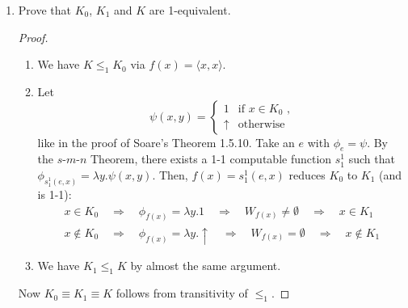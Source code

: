 \documentclass[a4paper,11pt]{article}
\begin{document}
\begin{enumerate}
\item %
Prove that $K_0$, $K_1$ and $K$ are 1-equivalent.

\begin{proof}
\begin{enumerate}
\item We have $K \leq_1 K_0$ via $f(x) = \langle x,x \rangle$.
\item Let
  \begin{equation*}
    \psi(x, y) = \begin{cases}
      1        & \text{if $x \in K_0$ ,}\\
      \uparrow & \text{otherwise}
    \end{cases}
  \end{equation*}
  like in the proof of Soare's Theorem 1.5.10.
  Take an $e$ with $\phi_e = \psi$.
  By the $s$-$m$-$n$ Theorem, there exists a 1-1 computable function $s^1_1$ such that
  $\phi_{s^1_1(e, x)} = \lambda y. \psi(x, y)$. Then, $f(x) = s^1_1(e, x)$ reduces $K_0$
  to $K_1$ (and is 1-1):
  \begin{align*}
    x \in K_0 \quad \Rightarrow \quad \phi_{f(x)} = \lambda y.1 \quad \Rightarrow \quad W_{f(x)} \neq \emptyset \quad \Rightarrow \quad x \in K_1\\
    x \notin K_0 \quad \Rightarrow \quad \phi_{f(x)} = \lambda y.\uparrow \quad \Rightarrow \quad W_{f(x)} = \emptyset \quad \Rightarrow \quad x \notin K_1
  \end{align*}
\item We have $K_1 \leq_1 K$ by almost the same argument.
\end{enumerate}
Now $K_0 \equiv K_1 \equiv K$ follows from transitivity of $\leq_1$.
\end{proof}


\end{enumerate}
\end{document}
